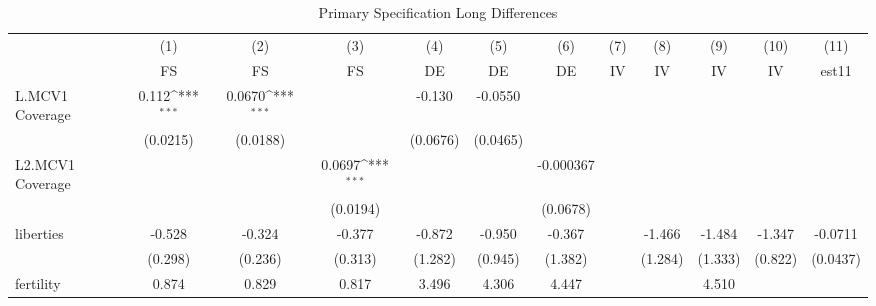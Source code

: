 \begin{table}[htbp]\centering
\def\sym#1{\ifmmode^{#1}\else\(^{#1}\)\fi}
\caption{Primary Specification Long Differences}
\begin{tabular}{l*{11}{c}}
\toprule
                &\multicolumn{1}{c}{(1)}&\multicolumn{1}{c}{(2)}&\multicolumn{1}{c}{(3)}&\multicolumn{1}{c}{(4)}&\multicolumn{1}{c}{(5)}&\multicolumn{1}{c}{(6)}&\multicolumn{1}{c}{(7)}&\multicolumn{1}{c}{(8)}&\multicolumn{1}{c}{(9)}&\multicolumn{1}{c}{(10)}&\multicolumn{1}{c}{(11)}\\
                &\multicolumn{1}{c}{FS}&\multicolumn{1}{c}{FS}&\multicolumn{1}{c}{FS}&\multicolumn{1}{c}{DE}&\multicolumn{1}{c}{DE}&\multicolumn{1}{c}{DE}&\multicolumn{1}{c}{IV}&\multicolumn{1}{c}{IV}&\multicolumn{1}{c}{IV}&\multicolumn{1}{c}{IV}&\multicolumn{1}{c}{est11}\\
\midrule
L.MCV1 Coverage &    0.112\sym{***}&   0.0670\sym{***}&                  &   -0.130         &  -0.0550         &                  &                  &                  &                  &                  &                  \\
                & (0.0215)         & (0.0188)         &                  & (0.0676)         & (0.0465)         &                  &                  &                  &                  &                  &                  \\
\addlinespace
L2.MCV1 Coverage&                  &                  &   0.0697\sym{***}&                  &                  &-0.000367         &                  &                  &                  &                  &                  \\
                &                  &                  & (0.0194)         &                  &                  & (0.0678)         &                  &                  &                  &                  &                  \\
\addlinespace
liberties       &   -0.528         &   -0.324         &   -0.377         &   -0.872         &   -0.950         &   -0.367         &                  &   -1.466         &   -1.484         &   -1.347         &  -0.0711         \\
                &  (0.298)         &  (0.236)         &  (0.313)         &  (1.282)         &  (0.945)         &  (1.382)         &                  &  (1.284)         &  (1.333)         &  (0.822)         & (0.0437)         \\
\addlinespace
fertility       &    0.874         &    0.829         &    0.817         &    3.496         &    4.306         &    4.447         &                  &                  &    4.510         &                  &                  \\

\end{tabular}
\end{table}
